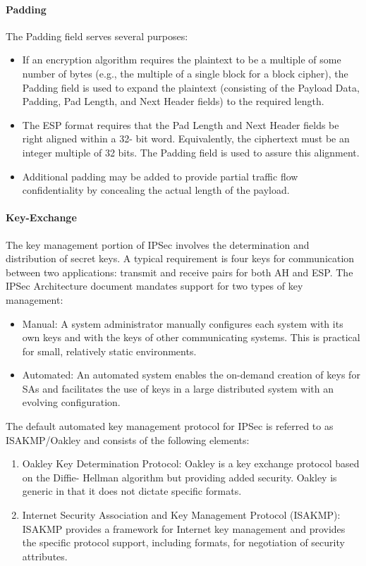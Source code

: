 \documentclass[12pt]{article}
\begin{document}
\paragraph*{Padding}
The Padding field serves several purposes:
\begin{itemize}
\item If an encryption algorithm requires the plaintext to be a multiple of some number of bytes (e.g., the multiple of a single block for a block cipher), the Padding field is used to expand the plaintext (consisting of the Payload Data, Padding, Pad Length, and Next Header fields) to the required length.
\item The ESP format requires that the Pad Length and Next Header fields be right aligned within a 32- bit word. Equivalently, the ciphertext must be an integer multiple of 32 bits. The Padding field is used to assure this alignment.
\item Additional padding may be added to provide partial traffic flow confidentiality by concealing the actual length of the payload.
\end{itemize}
\paragraph*{Key-Exchange}
The key management portion of IPSec involves the determination and distribution of secret keys. A typical requirement is four keys for communication between two applications: transmit and receive pairs for both AH and ESP. The IPSec Architecture document mandates support for two types of key management:
\begin{itemize}

\item Manual: A system administrator manually configures each system with its own keys and with the keys of other communicating systems. This is practical for small, relatively static environments.
\item Automated: An automated system enables the on-demand creation of keys for SAs and facilitates the use of keys in a large distributed system with an evolving configuration.
\end{itemize}
The default automated key management protocol for IPSec is referred to as ISAKMP/Oakley and consists of the following elements:
\begin{enumerate}

\item Oakley Key Determination Protocol: Oakley is a key exchange protocol based on the Diffie- Hellman algorithm but providing added security. Oakley is generic in that it does not dictate specific formats.
\item Internet Security Association and Key Management Protocol (ISAKMP): ISAKMP provides a framework for Internet key management and provides the specific protocol support, including formats, for negotiation of security attributes.
\end{enumerate}
\end{document}

